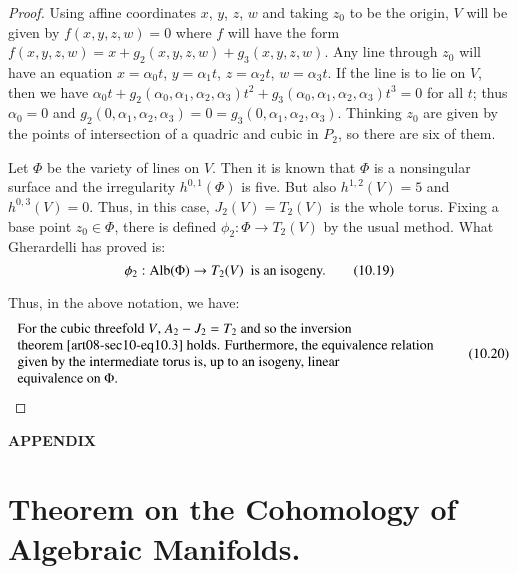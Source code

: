 \begin{proof}
Using affine coordinates $x$, $y$, $z$, $w$ and taking $z_{0}$ to be the origin, $V$ will be given by $f(x,y,z,w)=0$ where $f$ will have the form $f(x,y,z,w)=x+g_{2}(x,y,z,w)+g_{3}(x,y,z,w)$. Any line through $z_{0}$ will have an equation $x=\alpha_{0}t$, $y=\alpha_{1}t$, $z=\alpha_{2}t$, $w=\alpha_{3}t$. If the line is to lie on $V$, then we have $\alpha_{0}t+g_{2}(\alpha_{0},\alpha_{1},\alpha_{2},\alpha_{3})t^{2}+g_{3}(\alpha_{0},\alpha_{1},\alpha_{2},\alpha_{3})t^{3}=0$ for all $t$; thus $\alpha_{0}=0$ and $g_{2}(0,\alpha_{1},\alpha_{2},\alpha_{3})=0=g_{3}(0,\alpha_{1},\alpha_{2},\alpha_{3})$. Thinking $z_{0}$ are given by the points of intersection of a quadric and cubic in $P_{2}$, so there are six of them.

Let $\Phi$ be the variety of lines on $V$. Then it is known that $\Phi$ is a nonsingular surface and the irregularity $h^{0,1}(\Phi)$ is five. But also $h^{1,2}(V)=5$ and $h^{0,3}(V)=0$. Thus, in this case, $J_{2}(V)=T_{2}(V)$ is the whole torus. Fixing a base point $z_{0}\in \Phi$, there is defined $\phi_{2}:\Phi\to T_{2}(V)$ by the usual method. What Gherardelli has proved is:
\begin{equation*}
\phi_{2}:\operatorname{\mathrm{Alb}}(\Phi)\to T_{2}(V)\text{~ is an isogeny.}\tag{10.19}\label{art08-sec10-eq10.19}
\end{equation*}

Thus, in the above notation, we have:
\begin{equation*}
\begin{array}{l}
\text{For the cubic threefold $V$, $A_{2}-J_{2}=T_{2}$ and so the inversion}\\
\text{theorem \eqref{art08-sec10-eq10.3} holds. Furthermore, the equivalence relation}\\
\text{given by the intermediate torus is, up to an isogeny, linear}\\
\text{equivalence on $\Phi$.}
\end{array}\tag{10.20}\label{art08-sec10-eq10.20}
\end{equation*}
\end{proof}


\newpage

\begin{center}
{\Large\bf APPENDIX}
\end{center}

\section{Theorem on the Cohomology of Algebraic Manifolds.}\label{art08-app-A}

